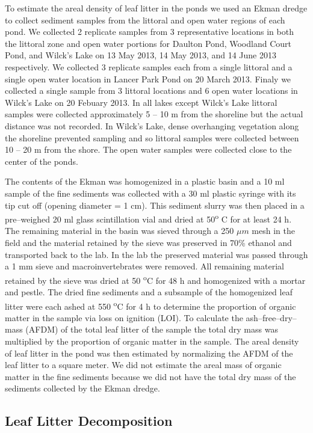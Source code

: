 \documentclass[12pt,letter]{article}
\begin{document}
To estimate the areal density of leaf litter in the ponds we used an Ekman dredge to collect sediment samples from the littoral and open water regions of each pond. We collected 2 replicate samples from 3 representative locations in both the littoral zone and open water portions for Daulton Pond, Woodland Court Pond, and Wilck's Lake on 13 May 2013, 14 May 2013, and 14 June 2013 respectively. We collected 3 replicate samples each from a single littoral and a single open water location in Lancer Park Pond on 20 March 2013.  Finaly we collected a single sample from 3 littoral locations and 6 open water locations in Wilck's Lake on 20 Febuary 2013. In all lakes except Wilck's Lake littoral samples were collected approximately 5 -- 10 m from the shoreline but the actual distance was not recorded. In Wilck's Lake, dense overhanging vegetation along the shoreline prevented sampling and so littoral samples were collected between 10 -- 20 m from the shore. The open water samples were collected close to the center of the ponds.

The contents of the Ekman was homogenized in a plastic basin and a 10 ml sample of the fine sediments was collected with a 30 ml plastic syringe with its tip cut off (opening diameter = 1 cm). This sediment slurry was then placed in a pre--weighed 20 ml glass scintillation vial and dried at 50\textsuperscript{o} C for at least 24 h. The remaining material in the basin was sieved through a 250 $\mu m$ mesh in the field and the material retained by the sieve was preserved in 70\% ethanol and transported back to the lab.  In the lab the preserved material was passed through a 1 mm sieve and macroinvertebrates were removed.  All remaining material retained by the sieve was dried at 50 \textsuperscript{o}C for 48 h and homogenized with a mortar and pestle. The dried fine sediments and a subsample of the homogenized leaf litter were each ashed at 550 \textsuperscript{o}C for 4 h to determine the proportion of organic matter in the sample via loss on ignition (LOI).  To calculate the ash--free--dry--mass (AFDM) of the total leaf litter of the sample the total dry mass was multiplied by the proportion of organic matter in the sample. The areal density of leaf litter in the pond was then estimated by normalizing the AFDM of the leaf litter to a square meter. We did not estimate the areal mass of organic matter in the fine sediments because we did not have the total dry mass of the sediments collected by the Ekman dredge.
  
  

\subsection{Leaf Litter Decomposition}
\end{document}
